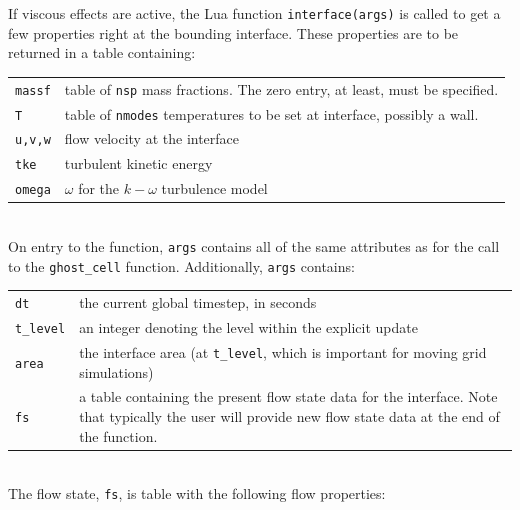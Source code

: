 \medskip
If viscous effects are active, the Lua function \texttt{interface(args)} is called to
get a few properties right at the bounding interface.
These properties are to be returned in a table containing:\\
\begin{tabular}{lp{12cm}}
 \texttt{massf} & table of \texttt{nsp} mass fractions. The zero entry, at least, must be specified. \\
 \texttt{T} & table of \texttt{nmodes} temperatures to be set at interface, possibly a wall.\\
 \texttt{u,v,w} & flow velocity at the interface \\
 \texttt{tke} &  turbulent kinetic energy \\
 \texttt{omega} &  $\omega$ for the $k-\omega$ turbulence model \\
\end{tabular}\\
On entry to the function, \texttt{args} contains all of the same attributes as for the call
to the \texttt{ghost\_cell} function. Additionally, \texttt{args} contains:\\
\begin{tabular}{lp{12cm}}
 \texttt{dt} &  the current global timestep, in seconds \\
 \texttt{t\_level} & an integer denoting the level within the explicit update\\
 \texttt{area} & the interface area (at \texttt{t\_level}, which is important for moving grid simulations)\\
 \texttt{fs} &  a table containing the present flow state data for the interface. Note that typically
                the user will provide new flow state data at the end of the function.\\
\end{tabular}\\
The flow state, \texttt{fs}, is table with the following flow properties:\\
